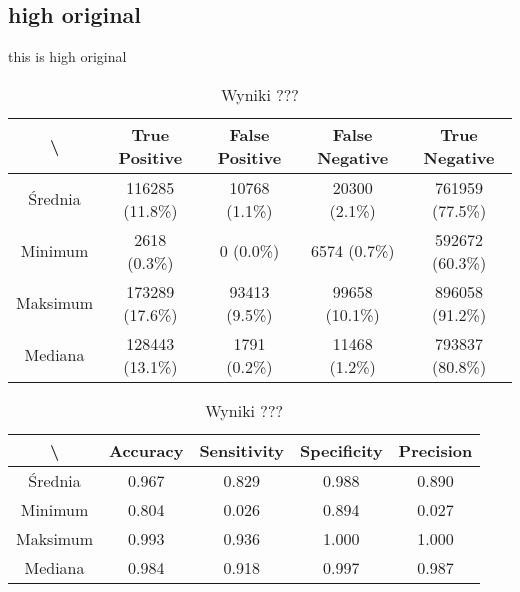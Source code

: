 \subsection{high original}
this is high original

\begin{table}[H]
	\centering
	\caption{Wyniki ???}
	\vspace{6pt}
	{\footnotesize
		\begin{tabular}{|c|c|c|c|c|}
      \hline \textbackslash & True Positive & False Positive & False Negative & True Negative \\
      \hline Średnia & 116285 (11.8\%) & 10768 (1.1\%) & 20300 (2.1\%) & 761959 (77.5\%) \\
      \hline Minimum & 2618 (0.3\%) & 0 (0.0\%) & 6574 (0.7\%) & 592672 (60.3\%) \\
      \hline Maksimum & 173289 (17.6\%) & 93413 (9.5\%) & 99658 (10.1\%) & 896058 (91.2\%) \\
      \hline Mediana & 128443 (13.1\%) & 1791 (0.2\%) & 11468 (1.2\%) & 793837 (80.8\%) \\
      \hline
		\end{tabular}
	}
	\vspace{0pt}
\end{table}


\begin{table}[H]
	\centering
	\caption{Wyniki ???}
	\vspace{6pt}
	{\footnotesize
		\begin{tabular}{|c|c|c|c|c|}
      \hline \textbackslash & Accuracy & Sensitivity & Specificity & Precision \\
      \hline Średnia & 0.967 & 0.829 & 0.988 & 0.890 \\
      \hline Minimum & 0.804 & 0.026 & 0.894 & 0.027 \\
      \hline Maksimum & 0.993 & 0.936 & 1.000 & 1.000 \\
      \hline Mediana & 0.984 & 0.918 & 0.997 & 0.987 \\
      \hline
		\end{tabular}
	}
	\vspace{0pt}
\end{table}



